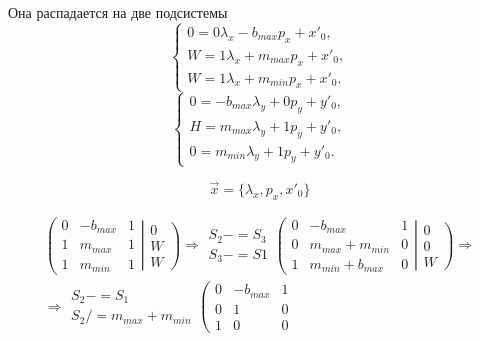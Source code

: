 Она распадается на две подсистемы
$$
\left\{
\begin{gathered}
	0 = 0 \lambda_x -b_{max} p_x + x'_0, \\
	W = 1 \lambda_x + m_{max} p_x + x'_0, \\
	W = 1 \lambda_x + m_{min} p_x + x'_0.
\end{gathered}
\right.
$$
$$
\left\{
\begin{gathered}
	0 = -b_{max} \lambda_y + 0 p_y + y'_0, \\
	H = m_{max} \lambda_y + 1 p_y + y'_0, \\
	0 = m_{min} \lambda_y + 1 p_y + y'_0.
\end{gathered}
\right.
$$

$$\vec{x} = \{\lambda_x, p_x, x'_0\}$$

$$
\begin{gathered}
	\left(
		\begin{array}{ccc}
			0 & -b_{max} & 1\\
			1 & m_{max} & 1 \\
			1 & m_{min} & 1
		\end{array}
		\right.
		\left|
		\begin{array}{c}
			0 \\ W \\ W
		\end{array}
	\right)
	\Rightarrow
	\begin{array}{c}
		S_2-=S_3\\
		S_3-=S1
	\end{array}
	\left(
		\begin{array}{ccc}
			0 & -b_{max} & 1\\
			0 & m_{max}+m_{min} & 0 \\
			1 & m_{min}+b_{max} & 0
		\end{array}
		\right.
		\left|
		\begin{array}{c}
			0 \\ 0 \\ W
		\end{array}
	\right)	
	\Rightarrow \\
	\Rightarrow
	\begin{array}{c}
		S_2-=S_1 \\
		S_2/=m_{max}+m_{min}
	\end{array}
	\left(
		\begin{array}{ccc}
			0 & -b_{max} & 1\\
			0 & 1 & 0 \\
			1 & 0 & 0
		\end{array}

\end{gathered}$$
